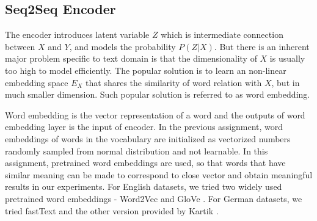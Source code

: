 \documentclass[11pt,a4paper]{article}
\begin{document}


\subsection{Seq2Seq Encoder}
The encoder introduces latent variable $Z$ which is intermediate connection between $X$ and $Y$, and models the probability $P(Z|X)$. But there is an inherent major problem specific to text domain is that the dimensionality of $X$ is usually too high to model efficiently. The popular solution is to learn an non-linear embedding space $E_X$ that shares the similarity of word relation with $X$, but in much smaller dimension. Such popular solution is referred to as word embedding. 

Word embedding is the vector representation of a word and the outputs of word embedding layer is the input of encoder. In the previous assignment, word embeddings of words in the vocabulary are initialized as vectorized numbers randomly sampled from normal distribution and not learnable. In this assignment, pretrained word embeddings are used, so that words that have similar meaning can be made to correspond to close vector and obtain meaningful results in our experiments. For English datasets, we tried two widely used pretrained word embeddings - Word2Vec \cite{mikolov2013distributed} and GloVe \cite{pennington2014glove}. For German datasets, we tried fastText \cite{joulin2016fasttext} and the other version provided by Kartik \cite{goyal2017continuous}. 
\end{document}

